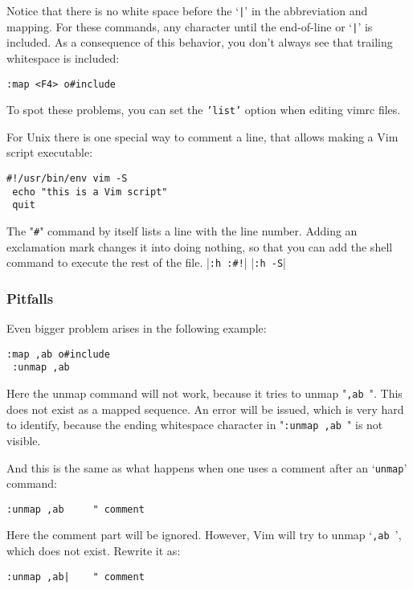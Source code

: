 Notice that there is no white space before the `\texttt{|}' in the abbreviation and mapping.
For these commands, any character until the end-of-line or `\texttt{|}' is included.
As a consequence of this behavior, you don't always see that trailing whitespace is included:

\begin{Verbatim}[samepage=true]
 :map <F4> o#include
\end{Verbatim}

To spot these problems, you can set the \texttt{'list'} option when editing vimrc files.

For Unix there is one special way to comment a line, that allows making a Vim script executable:

\begin{Verbatim}[samepage=true]
 #!/usr/bin/env vim -S
 echo "this is a Vim script"
 quit
\end{Verbatim}

The "\texttt{\#}" command by itself lists a line with the line number.
Adding an exclamation mark changes it into doing nothing, so that you can add the shell command to execute the rest of the file. |\texttt{:h :\#!}| |\texttt{:h -S}|

\subsubsection{Pitfalls}
Even bigger problem arises in the following example:

\begin{Verbatim}[samepage=true]
 :map ,ab o#include
 :unmap ,ab
\end{Verbatim}

Here the unmap command will not work, because it tries to unmap "\texttt{,ab }".
This does not exist as a mapped sequence.
An error will be issued, which is very hard to identify, because the ending whitespace character in "\texttt{:unmap ,ab }" is not visible.

And this is the same as what happens when one uses a comment after an `\texttt{unmap}' command:

\begin{Verbatim}[samepage=true]
 :unmap ,ab     " comment
\end{Verbatim}

Here the comment part will be ignored.
However, Vim will try to unmap `\texttt{,ab     }', which does not exist.
Rewrite it as:

\begin{Verbatim}[samepage=true]
 :unmap ,ab|    " comment
\end{Verbatim}

